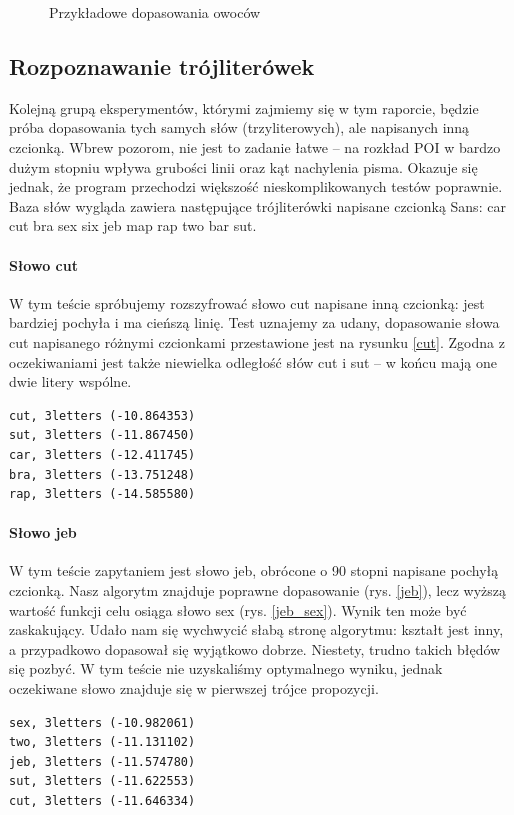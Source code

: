 \documentclass[a4paper,12pt,leqno]{article}
\begin{document}
\begin{figure}
\caption{Przykładowe dopasowania owoców}\label{matches}
\end{figure}

\subsection{Rozpoznawanie trójliterówek}

Kolejną grupą eksperymentów, którymi zajmiemy się w tym raporcie, będzie próba dopasowania tych samych słów (trzyliterowych), ale napisanych inną czcionką.
Wbrew pozorom, nie jest to zadanie łatwe -- na rozkład POI w bardzo dużym stopniu wpływa grubości linii oraz kąt nachylenia pisma. Okazuje się jednak, że
program przechodzi większość nieskomplikowanych testów poprawnie. Baza słów wygląda zawiera następujące trójliterówki napisane czcionką Sans:
car cut bra sex six jeb map rap two bar sut.

\paragraph{Słowo cut}
W tym teście spróbujemy rozszyfrować słowo cut napisane inną czcionką: jest bardziej pochyła i ma cieńszą linię. Test uznajemy za udany, dopasowanie słowa
cut napisanego różnymi czcionkami przestawione jest na rysunku \ref{cut}. Zgodna z oczekiwaniami jest także niewielka odległość słów cut i sut -- w końcu
mają one dwie litery wspólne.
\begin{verbatim}
cut, 3letters (-10.864353)
sut, 3letters (-11.867450)
car, 3letters (-12.411745)
bra, 3letters (-13.751248)
rap, 3letters (-14.585580)
\end{verbatim}

\paragraph{Słowo jeb}
W tym teście zapytaniem jest słowo jeb, obrócone o 90 stopni napisane pochyłą czcionką. Nasz algorytm znajduje poprawne dopasowanie (rys. \ref{jeb}), 
lecz wyższą wartość funkcji celu osiąga słowo sex (rys. \ref{jeb_sex}). Wynik ten może być zaskakujący. Udało nam się wychwycić słabą stronę algorytmu:
kształt jest inny, a przypadkowo dopasował się wyjątkowo dobrze. Niestety, trudno takich błędów się pozbyć. W tym teście nie uzyskaliśmy optymalnego
wyniku, jednak oczekiwane słowo znajduje się w pierwszej trójce propozycji.
\begin{verbatim}
sex, 3letters (-10.982061)
two, 3letters (-11.131102)
jeb, 3letters (-11.574780)
sut, 3letters (-11.622553)
cut, 3letters (-11.646334)
\end{verbatim}
\end{document}
